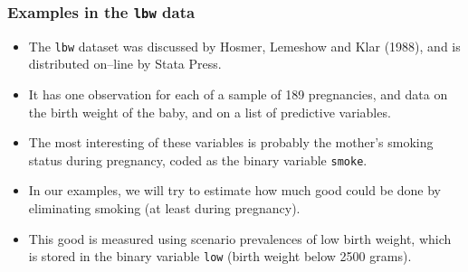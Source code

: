 \documentclass[11pt]{beamer}
\begin{document}
\begin{frame}
\frametitle{Examples in the \texttt{lbw} data}

\begin{itemize}

\item<2-> The \texttt{lbw} dataset was discussed by Hosmer, Lemeshow and Klar (1988)\cite{hosmer1988},
and is distributed on--line by Stata Press.

\item<3-> It has one observation for each of a sample of
189 pregnancies, and data on the birth weight of the baby,
and on a list of predictive variables.

\item<4-> The most interesting of these variables is probably the mother's smoking status during pregnancy,
coded as the binary variable \texttt{smoke}.

\item<5-> In our examples,
we will try to estimate how much good could be done by eliminating smoking (at least during pregnancy).

\item<6-> This good is measured using scenario prevalences of low birth weight,
which is stored in the binary variable \texttt{low}
(birth weight below 2500 grams).

\end{itemize}

\end{frame}
\end{document}

